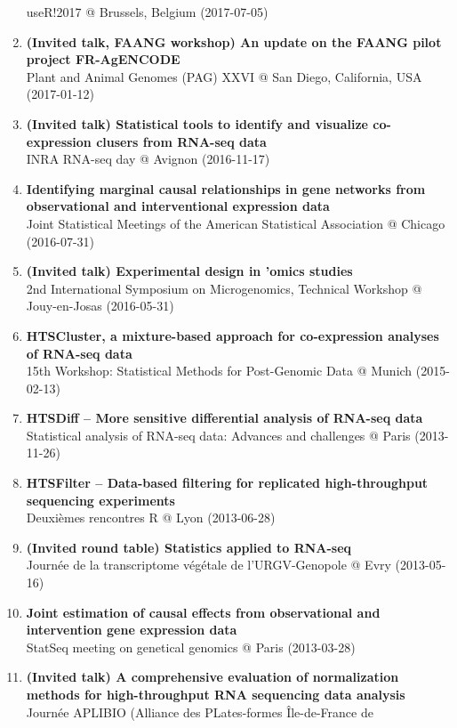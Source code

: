 \documentclass[11pt, a4paper]{awesome-cv}
\begin{document}
\begin{enumerate}
  useR!2017 @ Brussels, Belgium (2017-07-05)
\item
  \textbf{(Invited talk, FAANG workshop) An update on the FAANG pilot
  project FR-AgENCODE}\\
  Plant and Animal Genomes (PAG) XXVI @ San Diego, California, USA
  (2017-01-12)
\item
  \textbf{(Invited talk) Statistical tools to identify and visualize
  co-expression clusers from RNA-seq data}\\
  INRA RNA-seq day @ Avignon (2016-11-17)
\item
  \textbf{Identifying marginal causal relationships in gene networks
  from observational and interventional expression data}\\
  Joint Statistical Meetings of the American Statistical Association @
  Chicago (2016-07-31)
\item
  \textbf{(Invited talk) Experimental design in 'omics studies}\\
  2nd International Symposium on Microgenomics, Technical Workshop @
  Jouy-en-Josas (2016-05-31)
\item
  \textbf{HTSCluster, a mixture-based approach for co-expression
  analyses of RNA-seq data}\\
  15th Workshop: Statistical Methods for Post-Genomic Data @ Munich
  (2015-02-13)
\item
  \textbf{HTSDiff -- More sensitive differential analysis of RNA-seq
  data}\\
  Statistical analysis of RNA-seq data: Advances and challenges @ Paris
  (2013-11-26)
\item
  \textbf{HTSFilter -- Data-based filtering for replicated
  high-throughput sequencing experiments}\\
  Deuxièmes rencontres R @ Lyon (2013-06-28)
\item
  \textbf{(Invited round table) Statistics applied to RNA-seq}\\
  Journée de la transcriptome végétale de l'URGV-Genopole @ Evry
  (2013-05-16)
\item
  \textbf{Joint estimation of causal effects from observational and
  intervention gene expression data}\\
  StatSeq meeting on genetical genomics @ Paris (2013-03-28)
\item
  \textbf{(Invited talk) A comprehensive evaluation of normalization
  methods for high-throughput RNA sequencing data analysis}\\
  Journée APLIBIO (Alliance des PLates-formes Île-de-France de

\end{enumerate}
\end{document}
